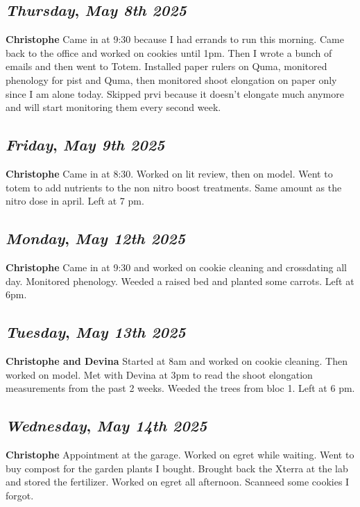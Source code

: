 \def\day{\textit{May 8th 2025}}
\def\weekday{\textit{Thursday}}
\subsection*{\weekday, \day}
\textbf {Christophe}
Came in at 9:30 because I had errands to run this morning. Came back to the office and worked on cookies until 1pm. Then I wrote a bunch of emails and then went to Totem. Installed paper rulers on Quma, monitored phenology for pist and Quma, then monitored shoot elongation on paper only since I am alone today. Skipped prvi because it doesn't elongate much anymore and will start monitoring them every second week. 

\def\day{\textit{May 9th 2025}}
\def\weekday{\textit{Friday}}
\subsection*{\weekday, \day}
\textbf {Christophe}
Came in at 8:30. Worked on lit review, then on model. Went to totem to add nutrients to the non nitro boost treatments. Same amount as the nitro dose in april. Left at 7 pm.

\def\day{\textit{May 12th 2025}}
\def\weekday{\textit{Monday}}
\subsection*{\weekday, \day}
\textbf {Christophe}
Came in at 9:30 and worked on cookie cleaning and crossdating all day. Monitored phenology. Weeded a raised bed and planted some carrots. Left at 6pm. 

\def\day{\textit{May 13th 2025}}
\def\weekday{\textit{Tuesday}}
\subsection*{\weekday, \day}
\textbf {Christophe and Devina}
Started at 8am and worked on cookie cleaning. Then worked on model. Met with Devina at 3pm to read the shoot elongation measurements from the past 2 weeks. Weeded the trees from bloc 1. Left at 6 pm. 

\def\day{\textit{May 14th 2025}}
\def\weekday{\textit{Wednesday}}
\subsection*{\weekday, \day}
\textbf {Christophe}
Appointment at the garage. Worked on egret while waiting. Went to buy compost for the garden plants I bought. Brought back the Xterra at the lab and stored the fertilizer. Worked on egret all afternoon. Scanneed some cookies I forgot.

